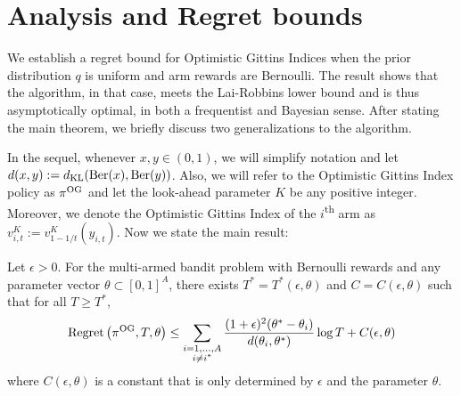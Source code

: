 \section{Analysis and Regret bounds} \label{sec:analysis_of_regret}
We establish a regret bound for Optimistic Gittins Indices when the prior distribution $q$ is uniform and arm rewards are Bernoulli. The result shows that the algorithm, in that case, meets the Lai-Robbins lower bound and is thus asymptotically optimal, in both a frequentist and Bayesian sense. After stating the main theorem, we briefly discuss two generalizations to the algorithm.

In the sequel, whenever $x,y \in (0,1)$, we will simplify notation  and let $d(x,y) := d_{\rm KL}(\text{Ber}(x),\text{Ber}(y))$. Also, we will refer to the Optimistic Gittins Index policy as $\pi^{\rm OG}$ and let the look-ahead parameter $K$ be any positive integer. Moreover, we denote the Optimistic Gittins Index of the $i$\textsuperscript{th} arm as $v^K_{i,t} := v^K_{1-1/t}(y_{i,t})$. Now we state the main result:
\begin{theorem} \label{thm:frequentist_optimal_bound}
	Let $\epsilon > 0$. For the multi-armed bandit problem with Bernoulli rewards and any parameter vector $\theta \subset [0,1]^A$, there exists $T^* = T^*(\epsilon, \theta)$ and $C = C(\epsilon,\theta)$ such that for all $T \ge T^*$,
	\begin{equation}
	\textnormal{Regret} \left( \pi^{\rm OG}, T, \theta \right) \le \sum_{\substack{i=1,\ldots,A \\ i \ne i^*}} \frac{(1+\epsilon)^2(\theta^* - \theta_i)}{d(\theta_i, \theta^*)} \log T  + C(\epsilon,\theta)
	\end{equation}
	where $C(\epsilon,\theta)$ is a constant that is only determined by $\epsilon$ and the parameter $\theta$.
\end{theorem}
